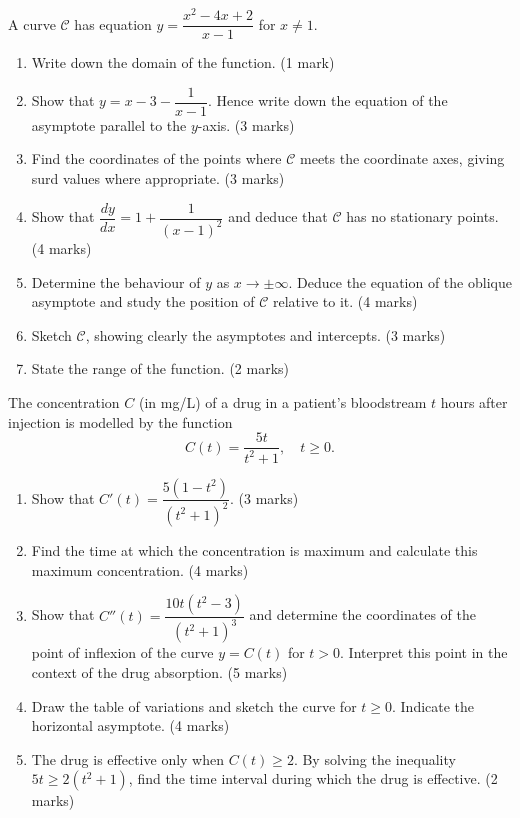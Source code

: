 \documentclass[11pt]{article}
\newcounter{popsec}
\newcounter{popsub}
\newcommand{\courssub}[1]{%
  \stepcounter{popsub}%
  \par\vspace{9pt}\noindent{\popxbold\fontsize{11.5}{13}\selectfont\color{popink}{\color{poporange}\thepopsec.\thepopsub}\hspace{6pt}#1}\par\nopagebreak\vspace{4pt}
}
\begin{document}
\courssub{I prepare for the GCE}

\begin{exercice}
A curve $\mathcal{C}$ has equation $y = \dfrac{x^2 - 4x + 2}{x - 1}$ for $x \neq 1$.
\begin{enumerate}
    \item Write down the domain of the function. \hfill (1 mark)
    \item Show that $y = x - 3 - \dfrac{1}{x-1}$. Hence write down the equation of the asymptote parallel to the $y$-axis. \hfill (3 marks)
    \item Find the coordinates of the points where $\mathcal{C}$ meets the coordinate axes, giving surd values where appropriate. \hfill (3 marks)
    \item Show that $\dfrac{dy}{dx} = 1 + \dfrac{1}{(x-1)^2}$ and deduce that $\mathcal{C}$ has no stationary points. \hfill (4 marks)
    \item Determine the behaviour of $y$ as $x \to \pm\infty$. Deduce the equation of the oblique asymptote and study the position of $\mathcal{C}$ relative to it. \hfill (4 marks)
    \item Sketch $\mathcal{C}$, showing clearly the asymptotes and intercepts. \hfill (3 marks)
    \item State the range of the function. \hfill (2 marks)
\end{enumerate}
\end{exercice}

\begin{exercice}
The concentration $C$ (in mg/L) of a drug in a patient's bloodstream $t$ hours after injection is modelled by the function
\[
C(t) = \frac{5t}{t^2 + 1}, \quad t \ge 0.
\]
\begin{enumerate}
    \item Show that $C'(t) = \dfrac{5(1 - t^2)}{(t^2 + 1)^2}$. \hfill (3 marks)
    \item Find the time at which the concentration is maximum and calculate this maximum concentration. \hfill (4 marks)
    \item Show that $C''(t) = \dfrac{10t(t^2 - 3)}{(t^2 + 1)^3}$ and determine the coordinates of the point of inflexion of the curve $y = C(t)$ for $t > 0$. Interpret this point in the context of the drug absorption. \hfill (5 marks)
    \item Draw the table of variations and sketch the curve for $t \ge 0$. Indicate the horizontal asymptote. \hfill (4 marks)
    \item The drug is effective only when $C(t) \ge 2$. By solving the inequality $5t \ge 2(t^2 + 1)$, find the time interval during which the drug is effective. \hfill (2 marks)
\end{enumerate}
\end{exercice}
\end{document}
